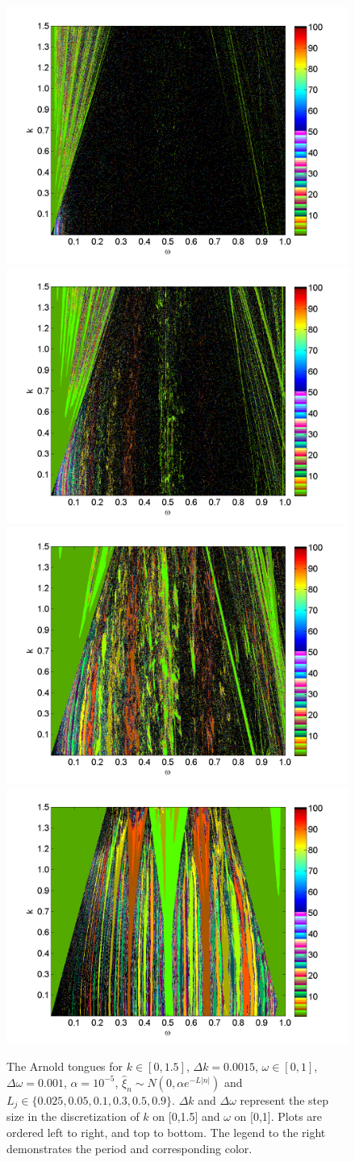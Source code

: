 \begin{figure}[H]\linespread{1}  
\caption[The Arnold tongues for the random circle map, normal
distribution, $\alpha = 10^{-5}$, $L \in (0.025,0.9)$]{The Arnold
  tongues for $k\in [0,1.5]$, $\Delta k = 0.0015$, $\omega \in [0,1]$,
  $\Delta \omega = 0.001$, $\alpha = 10^{-5}$, $\hat{\xi}_n\sim
  N(0,\alpha e^{-L|n|})$ and $L_j \in
  \{0.025,0.05,0.1,0.3,0.5,0.9\}$. $\Delta k$ and $\Delta \omega$
  represent the step size in the discretization of $k$ on [0,1.5] and $\omega$
  on [0,1]. Plots are ordered left to right, and top to bottom. The legend
to the right demonstrates the period and corresponding color.}\label{fig:rcirctongues_n}
\centering
\includegraphics[width=.5\textwidth]{figs/tongues_norm_1000_L_0025.png}\hfill
\includegraphics[width=.5\textwidth]{figs/tongues_norm_1000_L_005.png}\\
\includegraphics[width=.5\textwidth]{figs/tongues_norm_1000_L_01.png}\hfill
\includegraphics[width=.5\textwidth]{figs/tongues_norm_1000_L_03.png}\\

\end{figure}
